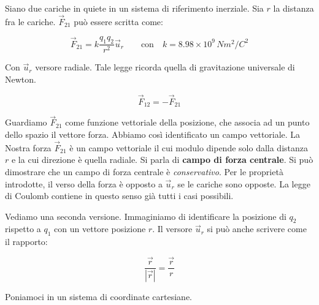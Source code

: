 Siano due cariche in quiete in un sistema di riferimento inerziale. Sia $r$ la distanza fra le cariche. $\vec{F}_{21}$ può essere scritta come:

\[
	\boxed{\vec{F}_{21}=k \frac{q_1q_2}{r^2} \vec{u}_r}  \qquad \text{con} \quad k=8.98\times 10^9 \, Nm^2 /C^2
\]

Con $\vec{u}_r$ versore radiale. Tale legge ricorda quella di gravitazione universale di Newton.

\[
	\vec{F}_{12}=-\vec{F}_{21}
\]

Guardiamo $\vec{F}_{21}$ come funzione vettoriale della posizione, che associa ad un punto dello spazio il vettore forza. Abbiamo così identificato un campo vettoriale. La Nostra forza $\vec{F}_{21}$ è un campo vettoriale il cui modulo dipende solo dalla distanza $r$ e la cui direzione è quella radiale. Si parla di \textbf{campo di forza centrale}. Si può dimostrare che un campo di forza centrale è \emph{conservativo}. Per le proprietà introdotte, il verso della forza è opposto a $\vec{u}_r$ se le cariche sono opposte. La legge di Coulomb contiene in questo senso già tutti i casi possibili.

Vediamo una seconda versione. Immaginiamo di identificare la posizione di $q_2$ rispetto a $q_1$ con un vettore posizione $r$. Il versore $\vec{u}_r$ si può anche scrivere come il rapporto:

\[
	\frac{\vec{r}}{|\vec{r} |} = \frac{\vec{r}}{r}
\]

Poniamoci in un sistema di coordinate cartesiane.

